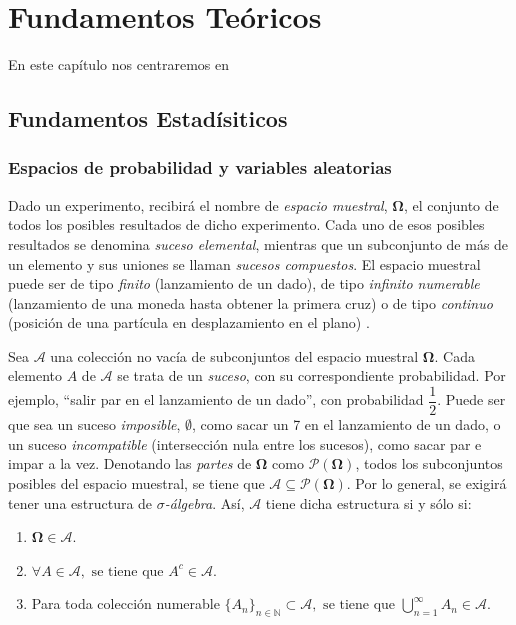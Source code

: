 \chapter{Fundamentos Teóricos} \label{Capitulo 2}

En este capítulo nos centraremos en 

\section{Fundamentos Estadísiticos}

\subsection{Espacios de probabilidad y variables aleatorias}

Dado un experimento, recibirá el nombre de {\sl espacio muestral}, $\mathbf{\Omega}$, el conjunto de todos los posibles resultados de dicho experimento. Cada uno de esos posibles resultados se denomina {\sl suceso elemental}, mientras que un subconjunto de más de un elemento y sus uniones se llaman {\sl sucesos compuestos}. El espacio muestral puede ser de tipo {\sl finito} (lanzamiento de un dado), de tipo {\sl infinito numerable} (lanzamiento de una moneda hasta obtener la primera cruz) o de tipo {\sl continuo} (posición de una partícula en desplazamiento en el plano) \cite{paloma1988lecciones}.

Sea $\mathscr{A}$ una colección no vacía de subconjuntos del espacio muestral $\mathbf{\Omega}$. Cada elemento $\textit{A}$ de $\mathscr{A}$ se trata de un {\sl suceso}, con su correspondiente probabilidad. Por ejemplo, ``salir par en el lanzamiento de un dado'', con probabilidad $\dfrac{1}{2}$. Puede ser que sea un suceso {\sl imposible}, $\emptyset$, como sacar un 7 en el lanzamiento de un dado, o un suceso {\sl incompatible} (intersección nula entre los sucesos), como sacar par e impar a la vez. Denotando las {\sl partes} de $\mathbf{\Omega}$ como $\mathscr{P}(\mathbf{\Omega})$, todos los subconjuntos posibles del espacio muestral, se tiene que $\mathscr{A} \subseteq
\mathscr{P}(\mathbf{\Omega})$. Por lo general, se exigirá tener una estructura de {\sl $\sigma$-álgebra}. Así, $\mathscr{A}$ tiene dicha estructura si y sólo si:
\begin{enumerate}
    \item $\mathbf{\Omega} \in \mathscr{A}$.
    \item $\forall A \in \mathscr{A}, \text{ se tiene que } A^{c} \in \mathscr{A}$.
    \item Para toda colección numerable $\{A_n\}_{n\in\mathbb{N}} \subset \mathscr{A}, \text{ se tiene que } \displaystyle\bigcup_{n=1}^{\infty} A_n \in \mathscr{A}$.
\end{enumerate}

